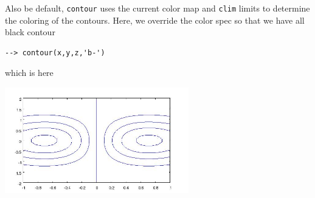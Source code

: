 Also be default, \verb|contour| uses the current color map and \verb|clim|
limits to determine the coloring of the contours.  Here, we override the
color spec so that we have all black contour
\begin{verbatim}
--> contour(x,y,z,'b-')
\end{verbatim}
which is here


\centerline{\includegraphics[width=8cm]{contour4}}

